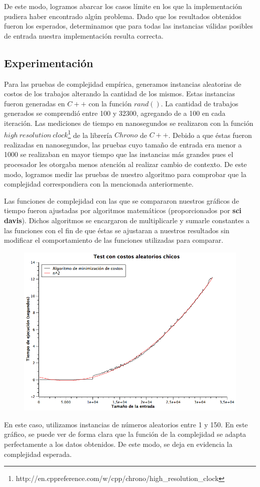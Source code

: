 De este modo, logramos abarcar los casos límite en los que la implementación pudiera haber encontrado algún problema. Dado que los resultados obtenidos fueron los esperados, determinamos que para todas las instancias válidas posibles de entrada nuestra implementación resulta correcta.

\subsection{Experimentación}
Para las pruebas de complejidad empírica, generamos instancias aleatorias de costos de los trabajos alterando la cantidad de los mismos. Estas instancias fueron generadas en $C++$ con la función $rand()$. La cantidad de trabajos generados se comprendió entre 100 y 32300, agregando de a 100 en cada iteración. Las mediciones de tiempo en nanosegundos se realizaron con la función $high\ resolution\ clock$\footnote{http://en.cppreference.com/w/cpp/chrono/high\_resolution\_clock} de la librería $Chrono$ de $C++$. Debido a que éstas fueron realizadas en nanosegundos, las pruebas cuyo tamaño de entrada era menor a 1000 se realizaban en mayor tiempo que las instancias más grandes pues el procesador les otorgaba menos atención al realizar cambio de contexto. De este modo, logramos medir las pruebas de nuestro algoritmo para comprobar que la complejidad correspondiera con la mencionada anteriormente.

Las funciones de complejidad con las que se compararon nuestros gráficos de tiempo fueron ajustadas por algoritmos matemáticos (proporcionados por \textbf{sci davis}). Dichos algoritmos se encargaron de multiplicarle y sumarle constantes a las funciones con el fin de que éstas se ajustaran a nuestros resultados sin modificar el comportamiento de las funciones utilizadas para comparar.

\begin{figure}[H] %
\begin{center}
\includegraphics[width=350pt]{../tests/ej1/testChico.png}
\end{center}
\end{figure}
En este caso, utilizamos instancias de números aleatorios entre 1 y 150. En este gráfico, se puede ver de forma clara que la función de la complejidad se adapta perfectamente a los datos obtenidos. De este modo, se deja en evidencia la complejidad esperada.



